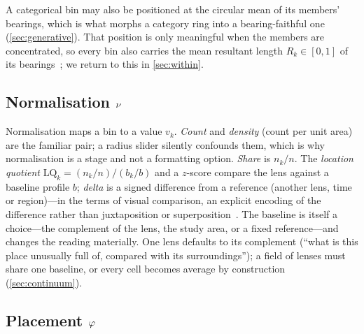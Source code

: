 A categorical bin may also be positioned at the circular mean of its members'
bearings, which is what morphs a category ring into a bearing-faithful one
(\cref{sec:generative}). That position is only meaningful when the members are
concentrated, so every bin also carries the mean resultant length
$R_k\in[0,1]$ of its bearings~\cite{mardia1999directional}; we return to this in
\cref{sec:within}.

\subsection{Normalisation $\nu$}

Normalisation maps a bin to a value $v_k$. \emph{Count} and \emph{density}
(count per unit area) are the familiar pair; a radius slider silently
confounds them, which is why normalisation is a stage and not a formatting
option. \emph{Share} is $n_k/n$. The \emph{location quotient}
$\mathrm{LQ}_k=(n_k/n)/(b_k/b)$ and a $z$-score compare the lens against a
baseline profile $b$; \emph{delta} is a signed difference from a reference
(another lens, time or region)---in the terms of visual comparison, an explicit
encoding of the difference rather than juxtaposition or
superposition~\cite{gleicher2011comparison}. The baseline is itself a choice---the
complement of the lens, the study area, or a fixed reference---and changes the
reading materially. One lens defaults to its complement (``what is this place
unusually full of, compared with its surroundings''); a field of lenses must
share one baseline, or every cell becomes average by construction
(\cref{sec:continuum}).

\subsection{Placement $\varphi$}
\label{sec:placement}

